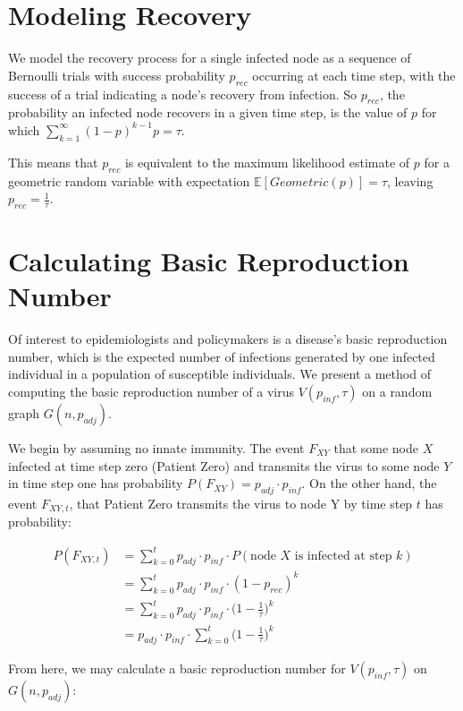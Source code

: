 \documentclass[psamsfonts]{amsart}
\theoremstyle{definition}
\theoremstyle{remark}
\numberwithin{equation}{section}
\begin{document}
\section{Modeling Recovery}

We model the recovery process for a single infected node as a sequence of Bernoulli trials with success probability $p_{rec}$ occurring at each time step, with the success of a trial indicating a node's recovery from infection. So $p_{rec}$, the probability an infected node recovers in a given time step, is the value of $p$ for which $\sum_{k=1}^{\infty} (1 - p)^{k-1}p = \tau$. 

This means that $p_{rec}$ is equivalent to the maximum likelihood estimate of $p$ for a geometric random variable with expectation $\mathbb{E}[Geometric(p)] = \tau$, leaving $p_{rec} = \frac{1}{\tau}$.

\section{Calculating Basic Reproduction Number}

Of interest to epidemiologists and policymakers is a disease's basic reproduction number, which is the expected number of infections generated by one infected individual in a population of susceptible individuals. We present a method of computing the basic reproduction number of a virus $V(p_{inf}, \tau)$ on a random graph $G(n, p_{adj})$.

We begin by assuming no innate immunity. The event ${F_{XY}}$ that some node $X$ infected at time step zero (Patient Zero) and transmits the virus to some node $Y$ in time step one has probability $P(F_{XY}) = p_{adj} \cdot  p_{inf}$. On the other hand, the event ${F_{XY, t}}$, that Patient Zero transmits the virus to node Y by time step $t$ has probability:

\begin{align}
P(F_{XY, t}) &= \sum_{k=0}^{t} p_{adj} \cdot  p_{inf} \cdot P(\text{node $X$ is infected at step $k$}) \nonumber\\
&=\sum_{k=0}^{t} p_{adj} \cdot  p_{inf} \cdot (1 -p_{rec})^k \nonumber\\
&=\sum_{k=0}^{t} p_{adj} \cdot  p_{inf} \cdot \Big(1 -\frac{1}{\tau}\Big)^k \nonumber\\
&= p_{adj} \cdot  p_{inf} \cdot \sum_{k=0}^{t} \Big(1 -\frac{1}{\tau}\Big)^k
\end{align}

From here, we may calculate a basic reproduction number for $V(p_{inf}, \tau)$ on $G(n, p_{adj})$:
\end{document}
